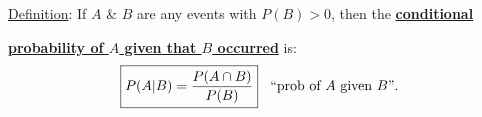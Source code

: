 \documentclass[11pt]{article}
\begin{document}
%
%
%


\noindent \underline{Definition}:  If $A$ \& $B$ are any events with $P(B)>0$,
then the \underline{\bf conditional}

\hspace{0.70in} \underline{\bf probability of $A$ given that $B$ occurred} is:
\begin{eqnarray*}
\fbox{\(P(A|B) = \displaystyle{\frac{P(A\cap B)}{P(B)}}\)} \;\; {\mbox{ ``prob of $A$
given $B$''}}.
\end{eqnarray*}
\end{document}
